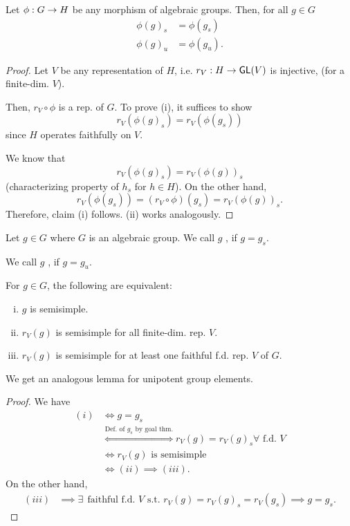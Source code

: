 \begin{corollary}
Let $\phi : G \overset{}{\rightarrow} H$ be any morphism of algebraic groups. Then, for all $g \in G$
\begin{align*}
\phi(g)_s &= \phi(g_s)\\
\phi(g)_u &= \phi(g_u).
\end{align*}
\end{corollary}
\begin{proof}
Let $V$ be any  representation of $H$, i.e. $r_V : H \overset{}{\rightarrow} \textsf{GL}(V)$ is injective, (for a finite-dim. $V$).

Then, $r_V \circ \phi$ is a rep. of $G$. To prove (i), it suffices to show
\[r_V(\phi(g)_s)  = r_V(\phi(g_s))\]
since $H$ operates faithfully on $V$.

We know that
\[r_V(\phi(g)_s) = r_V(\phi(g))_s \]
(characterizing property of $h_s$ for $h \in H$).
On the other hand,
\[ r_V(\phi(g_s)) = (r_V\circ \phi)(g_s) = r_V(\phi(g))_s.\]
Therefore, claim (i) follows. (ii) works analogously.
\end{proof}

\begin{definition}
	Let $g \in G$ where $G$ is an algebraic group.
	We call $g$ , if $g = g_s$.
	
	We call $g$ , if $g = g_u$.
\end{definition}

\begin{lemma}
	For $g \in G$, the following are equivalent:
	\begin{enumerate}[(i)]
		\item $g$ is semisimple.
		\item $r_V(g)$ is semisimple for all finite-dim. rep. $V$.
		\item $r_V(g)$ is semisimple for at least one faithful f.d. rep. $V$ of $G$.
	\end{enumerate}
\end{lemma}
We get an analogous lemma for unipotent group elements.
\begin{proof}
	We have
	\begin{align*}
	(i) &\iff g = g_s \\
	&\overset{\text{Def. of }g_s \text{ by goal thm.}}{\iff} r_V(g) = r_V(g)_s \forall \text{ f.d. } V \\
&\iff	r_V(g) \text{ is semisimple}\\
	&\iff(ii) \implies (iii).
	\end{align*}
	On the other hand,
	\begin{align*}
	(iii) & \implies \exists~~ \text{faithful f.d. }V \text{ s.t. } r_V(g) = r_V(g)_s = r_V(g_s) \implies g = g_s.
	\end{align*}
\end{proof}


